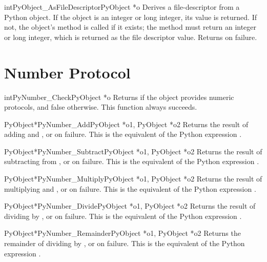 \documentclass{manual}
\begin{document}
\begin{cfuncdesc}{int}{PyObject_AsFileDescriptor}{PyObject *o}
Derives a file-descriptor from a Python object.  If the object
is an integer or long integer, its value is returned.  If not, the
object's  method is called if it exists; the method
must return an integer or long integer, which is returned as the file
descriptor value.  Returns  on failure.
\end{cfuncdesc}

\section{Number Protocol \label{number}}

\begin{cfuncdesc}{int}{PyNumber_Check}{PyObject *o}
Returns  if the object  provides numeric protocols, and
false otherwise. 
This function always succeeds.
\end{cfuncdesc}


\begin{cfuncdesc}{PyObject*}{PyNumber_Add}{PyObject *o1, PyObject *o2}
Returns the result of adding  and , or \NULL{} on
failure.  This is the equivalent of the Python expression
.
\end{cfuncdesc}


\begin{cfuncdesc}{PyObject*}{PyNumber_Subtract}{PyObject *o1, PyObject *o2}
Returns the result of subtracting  from , or
\NULL{} on failure.  This is the equivalent of the Python expression
.
\end{cfuncdesc}


\begin{cfuncdesc}{PyObject*}{PyNumber_Multiply}{PyObject *o1, PyObject *o2}
Returns the result of multiplying  and , or \NULL{} on
failure.  This is the equivalent of the Python expression
.
\end{cfuncdesc}


\begin{cfuncdesc}{PyObject*}{PyNumber_Divide}{PyObject *o1, PyObject *o2}
Returns the result of dividing  by , or \NULL{} on
failure. 
This is the equivalent of the Python expression .
\end{cfuncdesc}


\begin{cfuncdesc}{PyObject*}{PyNumber_Remainder}{PyObject *o1, PyObject *o2}
Returns the remainder of dividing  by , or \NULL{} on
failure.  This is the equivalent of the Python expression
.
\end{cfuncdesc}
\end{document}

